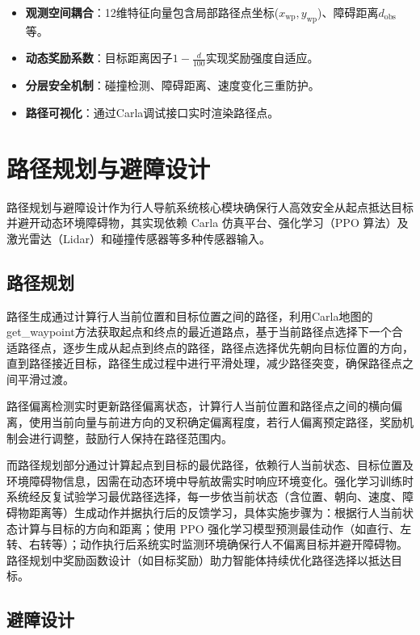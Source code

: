 \begin{itemize}
    \item \textbf{观测空间耦合}：12维特征向量包含局部路径点坐标($x_{\text{wp}}, y_{\text{wp}}$)、障碍距离$d_{\text{obs}}$等。
    \item \textbf{动态奖励系数}：目标距离因子$1 - \frac{d}{100}$实现奖励强度自适应。
    \item \textbf{分层安全机制}：碰撞检测、障碍距离、速度变化三重防护。
    \item \textbf{路径可视化}：通过Carla调试接口实时渲染路径点。
\end{itemize}

\section{路径规划与避障设计}

路径规划与避障设计作为行人导航系统核心模块确保行人高效安全从起点抵达目标并避开动态环境障碍物，其实现依赖 Carla 仿真平台、强化学习（PPO 算法）及激光雷达（Lidar）和碰撞传感器等多种传感器输入。

\subsection{路径规划}

路径生成通过计算行人当前位置和目标位置之间的路径，利用Carla地图的get\_waypoint方法获取起点和终点的最近道路点，基于当前路径点选择下一个合适路径点，逐步生成从起点到终点的路径，路径点选择优先朝向目标位置的方向，直到路径接近目标，路径生成过程中进行平滑处理，减少路径突变，确保路径点之间平滑过渡。

路径偏离检测实时更新路径偏离状态，计算行人当前位置和路径点之间的横向偏离，使用当前向量与前进方向的叉积确定偏离程度，若行人偏离预定路径，奖励机制会进行调整，鼓励行人保持在路径范围内。

而路径规划部分通过计算起点到目标的最优路径，依赖行人当前状态、目标位置及环境障碍物信息，因需在动态环境中导航故需实时响应环境变化。强化学习训练时系统经反复试验学习最优路径选择，每一步依当前状态（含位置、朝向、速度、障碍物距离等）生成动作并据执行后的反馈学习，具体实施步骤为：根据行人当前状态计算与目标的方向和距离；使用 PPO 强化学习模型预测最佳动作（如直行、左转、右转等）；动作执行后系统实时监测环境确保行人不偏离目标并避开障碍物。路径规划中奖励函数设计（如目标奖励）助力智能体持续优化路径选择以抵达目标。

\subsection{避障设计}

